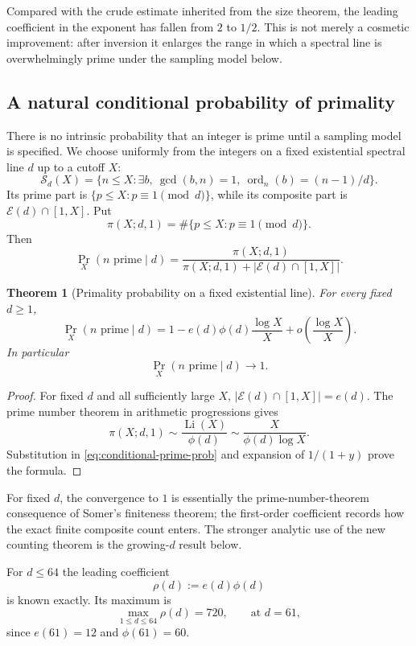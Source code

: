 \documentclass[11pt]{article}
\newtheorem{theorem}{Theorem}[section]
\newcommand{\ord}{\operatorname{ord}}
\newcommand{\Eset}{\mathcal E}
\begin{document}
Compared with the crude estimate inherited from the size theorem, the leading
coefficient in the exponent has fallen from $2$ to $1/2$.  This is not merely
a cosmetic improvement: after inversion it enlarges the range in which a
spectral line is overwhelmingly prime under the sampling model below.

\subsection{A natural conditional probability of primality}

There is no intrinsic probability that an integer is prime until a sampling
model is specified.  We choose uniformly from the integers on a fixed
existential spectral line $d$ up to a cutoff $X$:
\[
\mathcal S_d(X)=
\{n\le X:\exists b,\ \gcd(b,n)=1,\ \ord_n(b)=(n-1)/d\}.
\]
Its prime part is $\{p\le X:p\equiv1\pmod d\}$, while its composite part is
$\Eset(d)\cap[1,X]$.  Put
\[
\pi(X;d,1)=\#\{p\le X:p\equiv1\pmod d\}.
\]
Then
\begin{equation}
\Pr_X(n\text{ prime}\mid d)
=
\frac{\pi(X;d,1)}
{\pi(X;d,1)+|\Eset(d)\cap[1,X]|}.
\label{eq:conditional-prime-prob}
\end{equation}

\begin{theorem}[Primality probability on a fixed existential line]
\label{thm:conditional-prime-prob}
For every fixed $d\ge1$,
\[
\Pr_X(n\text{ prime}\mid d)
=
1-e(d)\phi(d)\frac{\log X}{X}
+o\!\left(\frac{\log X}{X}\right).
\]
In particular
\[
\boxed{\Pr_X(n\text{ prime}\mid d)\longrightarrow1.}
\]
\end{theorem}

\begin{proof}
For fixed $d$ and all sufficiently large $X$,
$|\Eset(d)\cap[1,X]|=e(d)$.  The prime number theorem in arithmetic
progressions gives
\[
\pi(X;d,1)\sim\frac{\operatorname{Li}(X)}{\phi(d)}
\sim\frac{X}{\phi(d)\log X}.
\]
Substitution in \eqref{eq:conditional-prime-prob} and expansion of
$1/(1+y)$ prove the formula.
\end{proof}

For fixed $d$, the convergence to $1$ is essentially the prime-number-theorem
consequence of Somer's finiteness theorem; the first-order coefficient records
how the exact finite composite count enters.  The stronger analytic use of the
new counting theorem is the growing-$d$ result below.

For $d\le64$ the leading coefficient
\[
\rho(d):=e(d)\phi(d)
\]
is known exactly.  Its maximum is
\[
\max_{1\le d\le64}\rho(d)=720,
\qquad\text{at }d=61,
\]
since $e(61)=12$ and $\phi(61)=60$.
\end{document}
